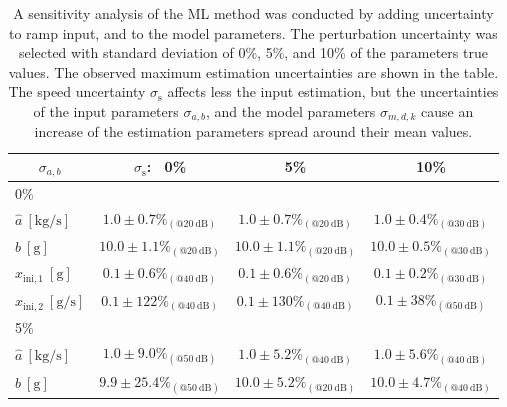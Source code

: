 \begin{table}[h!]
\centering
\caption{ A sensitivity analysis of the ML method was conducted by adding uncertainty to ramp input, and to the model parameters. The perturbation uncertainty was selected with standard deviation of 0\%, 5\%, and 10\% of the parameters true values. The observed maximum estimation uncertainties are shown in the table. The speed uncertainty $\sigma_{\mathrm{s}}$ affects less the input estimation, but the uncertainties of the input parameters $\sigma_{a,b}$, and the model parameters $\sigma_{m,d,k}$ cause an increase of the estimation parameters spread around their mean values.}
 
\begin{tabular}{c| c c c} 
\hline  
$\sigma_{{a},{b}}$ & $\sigma_{\mathrm{s}}$: \ 0\% & 5\% & 10\% \\ [0.5ex] 
\hline
 \multicolumn{1}{l|}{0\%} \\
 \multicolumn{1}{l|}{\hspace{2mm} $\widehat{a} \ \mathrm{[kg/s]}$} & $1.0 \pm 0.7 \%_{(@20 \ \mathrm{dB})}$ &  $1.0 \pm 0.7 \%_{(@20 \ \mathrm{dB})}$ & $1.0 \pm 0.4 \%_{(@30 \ \mathrm{dB})}$ \\ 
 \multicolumn{1}{l|}{\hspace{2mm} $\widehat{b} \ \mathrm{[g]}$} & $10.0 \pm 1.1 \%_{(@20 \ \mathrm{dB})}$ & $10.0 \pm 1.1 \%_{(@20 \ \mathrm{dB})}$ & $10.0 \pm 0.5 \%_{(@30 \ \mathrm{dB})}$ \\ 
 \multicolumn{1}{l|}{\hspace{2mm} $\widehat{x}_{\mathrm{ini,1}} \ \mathrm{[g]}$} & $0.1 \pm 0.6 \%_{(@40 \ \mathrm{dB})}$ & $0.1 \pm 0.6 \%_{(@20 \ \mathrm{dB})}$ & $0.1 \pm 0.2 \%_{(@30 \ \mathrm{dB})}$ \\
 \multicolumn{1}{l|}{\hspace{2mm} $\widehat{x}_{\mathrm{ini,2}} \ \mathrm{[g/s]}$} & $0.1 \pm 122 \%_{(@40 \ \mathrm{dB})}$ & $0.1 \pm 130 \%_{(@40 \ \mathrm{dB})}$ & $0.1 \pm 38 \%_{(@50 \ \mathrm{dB})}$ \\
 \multicolumn{1}{l|}{5\%} \\
 \multicolumn{1}{l|}{\hspace{2mm} $\widehat{a} \ \mathrm{[kg/s]}$} & $1.0 \pm 9.0 \%_{(@50 \ \mathrm{dB})}$ & $1.0 \pm 5.2 \%_{(@40 \ \mathrm{dB})}$ & $1.0 \pm 5.6 \%_{(@40 \ \mathrm{dB})}$ \\  
 \multicolumn{1}{l|}{\hspace{2mm} $\widehat{b} \ \mathrm{[g]}$} & $9.9 \pm 25.4 \%_{(@50 \ \mathrm{dB})}$ & $10.0 \pm 5.2 \%_{(@20 \ \mathrm{dB})}$ & $10.0 \pm 4.7 \%_{(@40 \ \mathrm{dB})}$ \\ 

\end{tabular}
\end{table}
